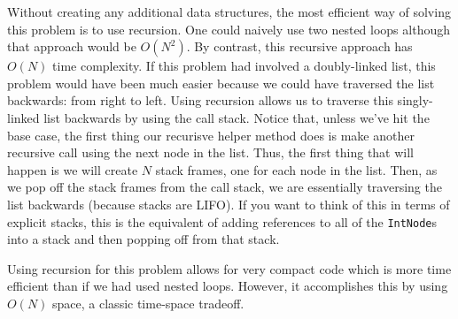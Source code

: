 \documentclass[12pt,letter]{article}
\begin{document}
Without creating any additional data structures, the most efficient way of solving this problem is to use recursion.
One could naively use two nested loops although that approach would be $O(N^2)$. By contrast, this recursive approach has
$O(N)$ time complexity. If this problem had involved a doubly-linked list, 
this problem would have been much easier because we could have traversed the list backwards: from right to left. 
Using recursion allows us to traverse this singly-linked list backwards by using the call stack. 
Notice that, unless we've hit the base case, the first thing our recurisve
helper method does is make another recursive call using the next node in the list. Thus, the first thing that will happen is we will create
$N$ stack frames, one for each node in the list. Then, as we pop off the stack frames from the call stack, we are essentially
traversing the list backwards (because stacks are LIFO). If you want to think of this in terms of explicit stacks,
this is the equivalent of adding references to all of the \texttt{IntNode}s into a stack and then popping off from that stack.

Using recursion for this problem allows for very compact code which is more time efficient than if we had used nested loops.
However, it accomplishes this by using $O(N)$ space, a classic time-space tradeoff.
\end{document}
